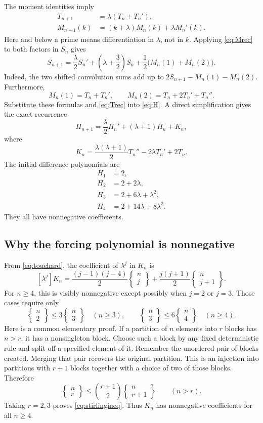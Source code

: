 \documentclass[11pt]{article}
\numberwithin{equation}{section}
\theoremstyle{remark}
\newcommand{\ST}[2]{\left\{\begin{matrix}#1\\#2\end{matrix}\right\}}
\begin{document}
The moment identities imply
\begin{align}
 T_{n+1}&=\lambda(T_n+T_n'),\label{eq:Trec}\\
 M_{n+1}(k)&=(k+\lambda)M_n(k)+\lambda M_n'(k).\label{eq:Mrec}
\end{align}
Here and below a prime means differentiation in $\lambda$, not in $k$.
Applying \eqref{eq:Mrec} to both factors in $S_n$ gives
\begin{equation}\label{eq:Srec}
 S_{n+1}=\frac\lambda2 S_n'
          +\left(\lambda+\frac32\right)S_n
          +\frac12\bigl(M_n(1)+M_n(2)\bigr).
\end{equation}
Indeed, the two shifted convolution sums add up to
$2S_{n+1}-M_n(1)-M_n(2)$. Furthermore,
\[
 M_n(1)=T_n+T_n',\qquad
 M_n(2)=T_n+2T_n'+T_n''.
\]
Substitute these formulas and \eqref{eq:Trec} into \eqref{eq:H}. A direct
simplification gives the exact recurrence
\begin{equation}\label{eq:Hrec}
 H_{n+1}=\frac\lambda2 H_n'+(\lambda+1)H_n+K_n,
\end{equation}
where
\begin{equation}\label{eq:K}
 K_n=\frac{\lambda(\lambda+1)}2T_n''-2\lambda T_n'+2T_n.
\end{equation}
The initial difference polynomials are
\begin{align*}
 H_1&=2,\\
 H_2&=2+2\lambda,\\
 H_3&=2+6\lambda+\lambda^2,\\
 H_4&=2+14\lambda+8\lambda^2.
\end{align*}
They all have nonnegative coefficients.

\subsection{Why the forcing polynomial is nonnegative}

From \eqref{eq:touchard}, the coefficient of $\lambda^j$ in $K_n$ is
\begin{equation}\label{eq:Kcoeff}
 [\lambda^j]K_n
 =\frac{(j-1)(j-4)}2\ST nj
   +\frac{j(j+1)}2\ST n{j+1}.
\end{equation}
For $n\ge4$, this is visibly nonnegative except possibly when $j=2$ or
$j=3$. Those cases require only
\begin{equation}\label{eq:stirlingineq}
 \ST n2\le3\ST n3\quad(n\ge3),\qquad
 \ST n3\le6\ST n4\quad(n\ge4).
\end{equation}
Here is a common elementary proof. If a partition of $n$ elements into
$r$ blocks has $n>r$, it has a nonsingleton block. Choose such a block by
any fixed deterministic rule and split off a specified element of it.
Remember the unordered pair of blocks created. Merging that pair
recovers the original partition. This is an injection into partitions
with $r+1$ blocks together with a choice of two of those blocks. Therefore
\begin{equation}\label{eq:mergeineq}
 \ST nr\le\binom{r+1}{2}\ST n{r+1}\qquad(n>r).
\end{equation}
Taking $r=2,3$ proves \eqref{eq:stirlingineq}.
Thus $K_n$ has nonnegative coefficients for all $n\ge4$.
\end{document}
